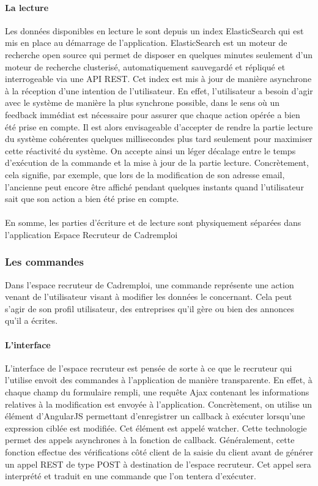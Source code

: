 \paragraph{La lecture}
\label{par:La lecture}
Les données disponibles en lecture le sont depuis un index ElasticSearch qui est mis en place au démarrage de l'application.
ElasticSearch est un moteur de recherche open source qui permet de disposer en quelques minutes seulement d'un moteur de recherche clusterisé, automatiquement sauvegardé et répliqué et interrogeable via une API REST.
Cet index est mis à jour de manière asynchrone à la réception d'une intention de l'utilisateur.
En effet, l'utilisateur a besoin d'agir avec le système de manière la plus synchrone possible, dans le sens où un feedback immédiat est nécessaire pour assurer que chaque action opérée a bien été prise en compte.
Il est alors envisageable d'accepter de rendre la partie lecture du système cohérentes quelques millisecondes plus tard seulement pour maximiser cette réactivité du système.
On accepte ainsi un léger décalage entre le temps d'exécution de la commande et la mise à jour de la partie lecture.
Concrètement, cela signifie, par exemple, que lors de la modification de son adresse email, l'ancienne peut encore être affiché pendant quelques instants quand l'utilisateur sait que son action a bien été prise en compte.
\paragraph{}
En somme, les parties d'écriture et de lecture sont physiquement séparées dans l'application Espace Recruteur de Cadremploi

\subsubsection{Les commandes}
\label{subs:Les commandes}
Dans l'espace recruteur de Cadremploi, une commande représente une action venant de l'utilisateur visant à modifier les données le concernant.
Cela peut s'agir de son profil utilisateur, des entreprises qu'il gère ou bien des annonces qu'il a écrites.
\paragraph{L'interface}
\label{par:L'interface}
L'interface de l'espace recruteur est pensée de sorte à ce que le recruteur qui l'utilise envoit des commandes à l'application de manière transparente.
En effet, à chaque champ du formulaire rempli, une requête Ajax contenant les informations relatives à la modification est envoyée à l'application.
Concrètement, on utilise un élément d'AngularJS permettant d'enregistrer un callback à exécuter lorsqu'une expression ciblée est modifiée.
Cet élément est appelé watcher.
Cette technologie permet des appels asynchrones à la fonction de callback.
Généralement, cette fonction effectue des vérifications côté client de la saisie du client avant de générer un appel REST de type POST à destination de l'espace recruteur.
Cet appel sera interprété et traduit en une commande que l'on tentera d'exécuter.

